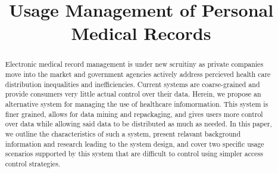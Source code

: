 \documentclass[10pt, conference, compsocconf]{IEEEtran}
\begin{document}
%
\title{Usage Management of Personal Medical Records}


\author{
}


% 

\maketitle


\begin{abstract}
Electronic medical record management is under new scruitiny as private companies move into the market and government agencies actively address percieved health care distribution inequalities and inefficiencies.  Current systems are coarse-grained and provide consumers very little actual control over their data.  Herein, we propose an alternative system for managing the use of healthcare infomormation.  This system is finer grained, allows for data mining and repackaging, and gives users more control over data while allowing said data to be distributed as much as needed.  In this paper, we outline the characteristics of such a system, present relavant background information and research leading to the system design, and cover two specific usage scenarios supported by this system that are difficult to control using simpler access control strategies.
\end{abstract}
\end{document}
